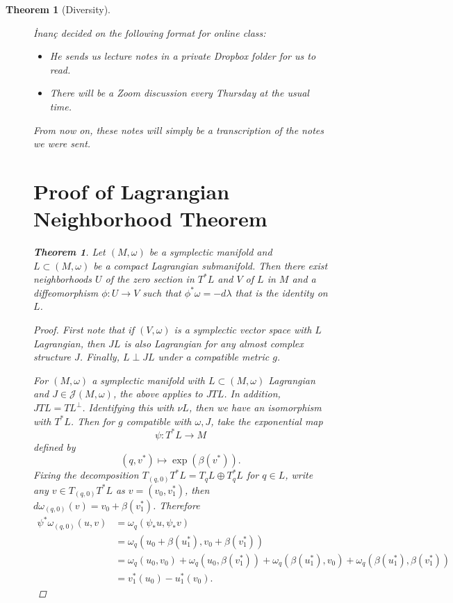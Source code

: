 \documentclass[leqno, openany]{memoir}
\newtheorem{thm}{Theorem}[chapter]
\theoremstyle{definition}
\theoremstyle{remark}
\theoremstyle{plain}
\newtheorem*{thm*}{Theorem}
\theoremstyle{definition}
\theoremstyle{remark}
\newcommand{\mc}[1]{\mathcal{#1}}
\begin{document}
\begin{thm}[Diversity]
\begin{figure}[H]
    \.Inan\c{c} decided on the following format for online class:
\begin{itemize} \item He sends us lecture notes in a private Dropbox folder for
us to read.  \item There will be a Zoom discussion every Thursday at the usual
time.  \end{itemize} From now on, these notes will simply be a transcription of
the notes we were sent.

    \section{Proof of Lagrangian Neighborhood Theorem}%
    \label{sec:proof_of_lagrangian_neighborhood_theorem}
    
     \begin{thm*} Let $(M, \omega)$ be a symplectic manifold and $L \subset (M,
         \omega)$ be a compact Lagrangian submanifold. Then there exist
         neighborhoods $U$ of the zero section in $T^*L$ and $V$ of $L$ in $M$
         and a diffeomorphism $\phi: U \to V$ such that $\phi^* \omega = - d
         \lambda$ that is the identity on $L$.  \end{thm*}

    \begin{proof} First note that if $(V, \omega)$ is a symplectic vector space
        with $L$ Lagrangian, then $JL$ is also Lagrangian for any almost
        complex structure $J$. Finally, $L \perp JL$ under a compatible metric
        $g$.

        For $(M, \omega)$ a symplectic manifold with $L \subset (M, \omega)$
        Lagrangian and $J \in \mc{J}(M, \omega)$, the above applies to $J TL$.
        In addition, $JTL = TL^{\perp}$. Identifying this with $\nu L$, then we
        have an isomorphism with $T^* L$. Then for $g$ compatible with $\omega,
        J$, take the exponential map \[ \psi: T^*L \to M \] defined by \[ (q,
    v^*) \mapsto \exp(\beta(v^*)). \] Fixing the decomposition $T_{(q,0)} T^*L
    = T_qL \oplus T_q^*L$ for $q \in L$, write any $v \in T_{(q,0)} T^*L$ as $v
    = (v_0, v_1^*)$, then $d \omega_{(q,0)}(v) = v_0 + \beta(v_1^*)$. Therefore
    \begin{align*} \psi^* \omega_{(q,0)} (u,v) &= \omega_q(\psi_* u, \psi_*v)
    \\ &= \omega_q(u_0 + \beta(u_1^*), v_0 + \beta(v_1^*)) \\ &= \omega_q(u_0,
    v_0) + \omega_q(u_0, \beta(v_1^*)) + \omega_q(\beta(u_1^*), v_0) +
    \omega_q(\beta(u_1^*), \beta(v_1^*)) \\ &= v_1^*(u_0) - u_1^*(v_0).
\end{align*}


\end{proof}
\end{figure}
\end{thm}
\end{document}
